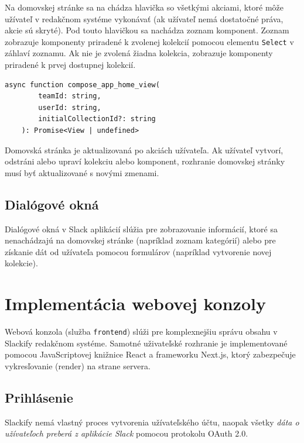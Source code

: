 
\noindent Na domovskej stránke sa na chádza hlavička so všetkými akciami, ktoré môže užívateľ v redakčnom systéme vykonávať (ak užívateľ nemá dostatočné práva, akcie sú skryté). Pod touto hlavičkou sa nachádza zoznam komponent. Zoznam zobrazuje komponenty priradené k zvolenej kolekcií pomocou elementu \texttt{Select} v záhlaví zoznamu. Ak nie je zvolená žiadna kolekcia, zobrazuje komponenty priradené k prvej dostupnej kolekcií. \\

\begin{lstlisting}[caption={Funkcia zodpovedná za generovanie rozhrania domovskej stránky.}]
	async function compose_app_home_view(
		teamId: string,
		userId: string,
		initialCollectionId?: string
	): Promise<View | undefined>
\end{lstlisting}

\medskip

\noindent Domovská stránka je aktualizovaná po akciách užívateľa. Ak užívateľ vytvorí, odstráni alebo upraví kolekciu alebo komponent, rozhranie domovskej stránky musí byť aktualizované s novými zmenami.

\section{Dialógové okná}
Dialógové okná v Slack aplikácií slúžia pre zobrazovanie informácií, ktoré sa nenachádzajú na domovskej stránke (napríklad zoznam kategórií) alebo pre získanie dát od užívateľa pomocou formulárov (napríklad vytvorenie novej kolekcie).

\chapter{Implementácia webovej konzoly}
\label{impl:frontend}
Webová konzola (služba \texttt{frontend}) slúži pre komplexnejšiu správu obsahu v Slackify redakčnom systéme. Samotné uživateľské rozhranie je implementované pomocou JavaScriptovej knižnice React a frameworku Next.js, ktorý zabezpečuje vykresľovanie (render) na strane servera.

\section{Prihlásenie}
Slackify nemá vlastný proces vytvorenia užívateľského účtu, naopak všetky \emph{dáta o užívateľoch preberá z aplikácie Slack} pomocou protokolu OAuth 2.0. \\

